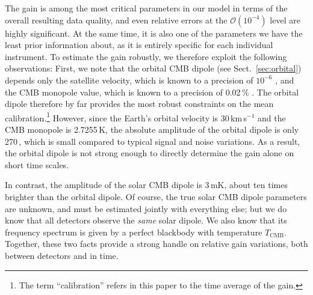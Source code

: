 \documentclass[twocolumn]{aa}
\begin{document}
The gain is among the most critical parameters in our model in terms
of the overall resulting data quality, and even relative errors at the
$\mathcal{O}(10^{-4})$ level are highly significant. At the same time,
it is also one of the parameters we have the least prior information
about, as it is entirely specific for each individual instrument. To
estimate the gain robustly, we therefore exploit the following
observations: First, we note that the orbital CMB dipole (see
Sect.~\ref{sec:orbital}) depends only the satellite velocity, which is
known to a precision of $10^{-6}$ \citep{godard2009}, and
the CMB monopole value, which is known to a precision of 0.02\,\%
\citep{fixsen2009}. The orbital dipole therefore by far provides the
most robust constraints on the mean calibration.\footnote{The term
  ``calibration'' refers in this paper to the time average of the
  gain.} However, since the Earth's orbital velocity is
30\,km\,s$^{-1}$ and the CMB monopole is 2.7255\,K, the absolute
amplitude of the orbital dipole is only 270\,\muK, which is small
compared to typical signal and noise variations. As a result, the
orbital dipole is not strong enough to directly determine the gain
alone on short time scales.

In contrast, the amplitude of the solar CMB dipole is 3\,mK, about ten
times brighter than the orbital dipole. Of course, the true solar CMB
dipole parameters are unknown, and must be estimated jointly with
everything else; but we do know that all detectors observe the
\emph{same} solar dipole. We also know that its frequency spectrum is
given by a perfect blackbody with temperature $T_{\mathrm{CMB}}$. Together, these
two facts provide a strong handle on relative gain variations, both
between detectors and in time.
\end{document}
